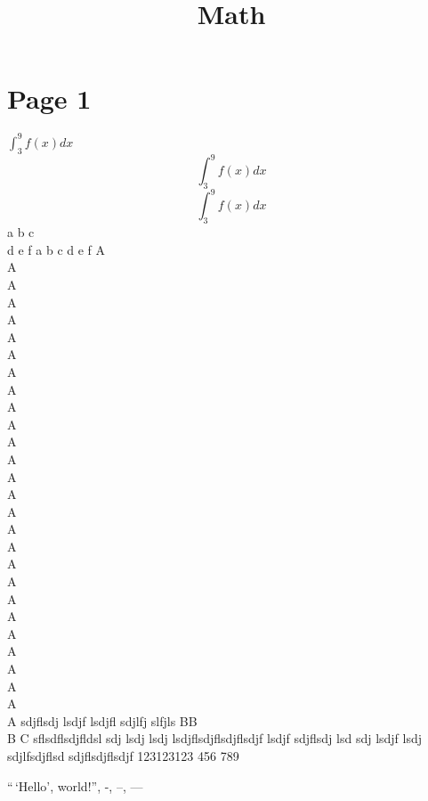 \documentclass[fleqn]{article}
\begin{document}
\title{Math}
\author{}
\date{}
\maketitle

\section*{Page 1}
$\int_{3}^{9} f(x)dx $ 
\Huge 
\begin{equation}
\int_{3}^{9} f(x)dx
\end{equation}
\normalsize
\[
\int_{3}^{9} f(x)dx
\]
\newline
a b c \\
d e f
\newline
a b c\linebreak
d e f
\newpage
\null
\newpage
\Huge A \\
\Huge A \\
\Huge A \\
\Huge A \\
\Huge A \\
\Huge A \\
\Huge A \\
\Huge A \\
\Huge A \\
\Huge A \\
\Huge A \\
\Huge A \\
\Huge A \\
\Huge A \\
\Huge A \\
\Huge A \\
\Huge A \\
\Huge A \\
\Huge A \\
\Huge A \\
\Huge A \\
\Huge A \\
\Huge A \\
\Huge A \\
\Huge A \\
\Huge A \\
\Huge A \\
\Huge A sdjflsdj lsdjf lsdjfl sdjlfj slfjls
\pagebreak
\Huge BB \\
B
\Huge C \Large sflsdflsdjfldsl sdj lsdj lsdj lsdjflsdjflsdjflsdjf lsdjf sdjflsdj lsd sdj lsdjf lsdj sdjlfsdjflsd
sdjflsdjflsdjf 123123123 456 789

``\,`Hello', world!'', -, --, ---\\
\end{document}
